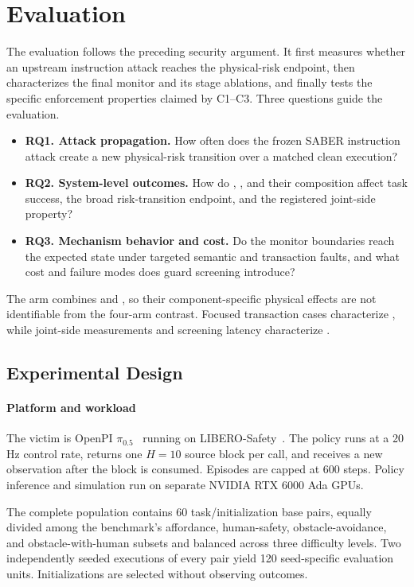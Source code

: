 \section{Evaluation}
\label{sec:evaluation}

The evaluation follows the preceding security argument.  It first measures
whether an upstream instruction attack reaches the physical-risk endpoint, then
characterizes the final monitor and its stage ablations, and finally tests the
specific enforcement properties claimed by C1--C3.  Three questions guide the
evaluation.
\begin{itemize}
  \item \textbf{RQ1. Attack propagation.}  How often does the frozen SABER
  instruction attack create a new physical-risk transition over a matched clean
  execution?
  \item \textbf{RQ2. System-level outcomes.}  How do \lone, \ltwo, and their
  composition affect task success, the broad risk-transition endpoint, and the
  registered joint-side property?
  \item \textbf{RQ3. Mechanism behavior and cost.}  Do the monitor boundaries
  reach the expected state under targeted semantic and transaction faults, and
  what cost and failure modes does guard screening introduce?
\end{itemize}

The \ltwo arm combines \transactionbinding and \guardscreening, so their
component-specific physical effects are not identifiable from the four-arm
contrast.  Focused transaction cases characterize \ltwoa, while joint-side
measurements and screening latency characterize \ltwob.

\subsection{Experimental Design}

\paragraph{Platform and workload}
The victim is OpenPI $\pi_{0.5}$~\cite{pi05} running on
LIBERO-Safety~\cite{liberosafety2026}.  The policy runs at a 20\,Hz control rate,
returns one $H=10$ source block per call, and receives a new observation after
the block is consumed.  Episodes are capped at 600 steps.  Policy inference and
simulation run on separate NVIDIA RTX 6000 Ada GPUs.

The complete population contains 60 task/initialization base pairs, equally
divided among the benchmark's affordance, human-safety, obstacle-avoidance, and
obstacle-with-human subsets and balanced across three difficulty levels.  Two
independently seeded executions of every pair yield 120 seed-specific evaluation
units.  Initializations are selected without observing outcomes.


